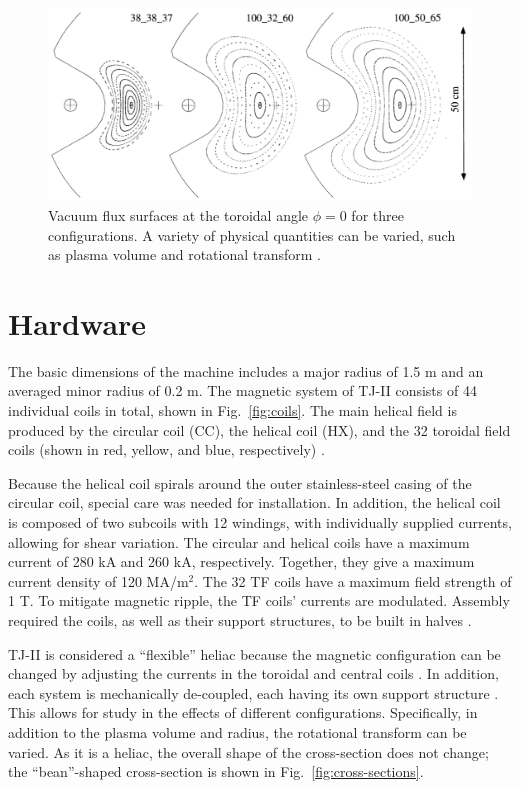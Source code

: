 \documentclass[a4paper]{article}
\begin{document}
\begin{figure}
\centering
	\includegraphics[width=\linewidth]{../Graphics/3_configs.png}
	\caption{Vacuum flux surfaces at the toroidal angle $\phi = 0$ for three configurations. A variety of physical quantities can be varied, such as plasma volume and rotational transform \cite{alejaldre_first_1999}.}
	\label{fig:3_configs}
\end{figure}


\section*{Hardware}
The basic dimensions of the machine includes a major radius of 1.5 m and an averaged minor radius of 0.2 m. The magnetic system of TJ-II consists of 44 individual coils in total, shown in Fig.~\ref{fig:coils}.
The main helical field is produced by the circular coil (CC), the helical coil (HX), and the 32 toroidal field coils (shown in red, yellow, and blue, respectively) \cite{tj-ii_nodate}.

Because the helical coil spirals around the outer stainless-steel casing of the circular coil, special care was needed for installation.
In addition, the helical coil is composed of two subcoils with 12 windings, with individually supplied currents, allowing for shear variation.
The circular and helical coils have a maximum current of 280 kA and 260 kA, respectively.
Together, they give a maximum current density of 120 MA/m$^2$.
The 32 TF coils have a maximum field strength of 1 T.
To mitigate magnetic ripple, the TF coils' currents are modulated.
Assembly required the coils, as well as their support structures, to be built in halves \cite{ascasibar_overview_2001}.

TJ-II is considered a ``flexible'' heliac because the magnetic configuration can be changed by adjusting the currents in the toroidal and central coils \cite{solano_study_1988}.
In addition, each system is mechanically de-coupled, each having its own support structure \cite{ascasibar_overview_2001}.
This allows for study in the effects of different configurations.
Specifically, in addition to the plasma volume and radius, the rotational transform can be varied.
As it is a heliac, the overall shape of the cross-section does not change; the ``bean''-shaped cross-section is shown in Fig.~\ref{fig:cross-sections}.
\end{document}
